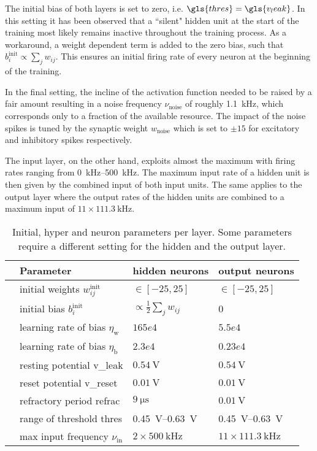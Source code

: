 The initial bias of both layers is set to zero, i.e. $\gls{thres} = \gls{v_leak}$. In this setting it has been observed that a ``silent" hidden unit at the start of the training most likely remains inactive throughout the training process. As a workaround, a weight dependent term is added to the zero bias, such that $b_i^\text{init} \propto \sum_j w_{ij}$. This ensures an initial firing rate of every neuron at the beginning of the training.

In the final setting, the incline of the activation function needed to be raised by a fair amount resulting in a noise frequency $\nu_\text{noise}$ of roughly \SI{1.1}{\kilo \Hz}, which corresponds only to a fraction of the available resource. The impact of the noise spikes is tuned by the synaptic weight $w_\text{noise}$ which is set to $\pm 15$ for excitatory and inhibitory spikes respectively.

The input layer, on the other hand, exploits almost the maximum with firing rates ranging from \SIrange{0}{500}{\kilo \Hz}. The maximum input rate of a hidden unit is then given by the combined input of both input units. The same applies to the output layer where the output rates of the hidden units are combined to a maximum input of $11 \times \SI{111.3}{\kilo \Hz}$.

\begin{table}\centering{}
	\begin{tabular}{@{}rlll@{}}\toprule
		& Parameter								& 	hidden neurons 			& 	output neurons 	\\ \midrule
		& initial weights $w_{ij}^\text{init}$	& 	 $\in[-25, 25]$			&	$\in[-25, 25]$	\\
		& initial bias $b_{i}^\text{init}$		& $\propto \frac{1}{2} \sum_j w_{ij}$ &	0		\\
		& learning rate of bias  $\eta_\text{w}$&	$165e4$					& 	$5.5e4$			\\
		& learning rate of bias  $\eta_\text{b}$&	$2.3e4$					& 	$0.23e4$		\\
		& resting potential \gls{v_leak}		&	$\SI{0.54}{\V}$ 		& 	$\SI{0.54}{\V}$	\\
		& reset potential \gls{v_reset}			&	$\SI{0.01}{\V}$			& 	$\SI{0.01}{\V}$	\\
		& refractory period \gls{refrac}		&	$\SI{9}{\micro \s}$			& 	$\SI{0.01}{\V}$	\\
		& range of threshold \gls{thres} 				&	\SIrange{0.45}{0.63}{\V}&	\SIrange{0.45}{0.63}{\V}\\
		& max input frequency $\nu_{\text{in}}$	&	$2 \times \SI{500}{\kilo \Hz}$	& $11 \times \SI{111.3}{\kilo\Hz}$	\\
		\bottomrule
	\end{tabular}
	\caption[Initial, hyper and neuron parameters per layer.]{Initial, hyper and neuron parameters per layer. Some parameters require a different setting for the hidden and the output layer.}
	\label{circlesinitparameters}
\end{table}

